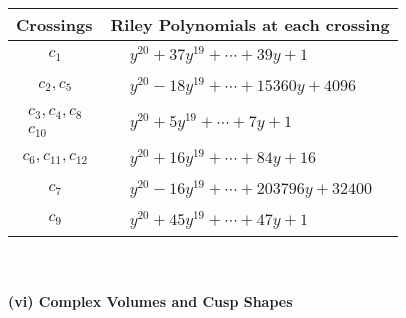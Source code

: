 \documentclass[1p]{elsarticle_modified}
\theoremstyle{definition}
\begin{document}
\begin{tabular}{m{50pt}|m{274pt}}
Crossings & \hspace{64pt}Riley Polynomials at each crossing \\
\hline $$\begin{aligned}c_{1}\end{aligned}$$&$\begin{aligned}
&y^{20}+37 y^{19}+\cdots+39 y+1
\end{aligned}$\\
\hline $$\begin{aligned}c_{2},c_{5}\end{aligned}$$&$\begin{aligned}
&y^{20}-18 y^{19}+\cdots+15360 y+4096
\end{aligned}$\\
\hline $$\begin{aligned}c_{3},c_{4},c_{8}\\c_{10}\end{aligned}$$&$\begin{aligned}
&y^{20}+5 y^{19}+\cdots+7 y+1
\end{aligned}$\\
\hline $$\begin{aligned}c_{6},c_{11},c_{12}\end{aligned}$$&$\begin{aligned}
&y^{20}+16 y^{19}+\cdots+84 y+16
\end{aligned}$\\
\hline $$\begin{aligned}c_{7}\end{aligned}$$&$\begin{aligned}
&y^{20}-16 y^{19}+\cdots+203796 y+32400
\end{aligned}$\\
\hline $$\begin{aligned}c_{9}\end{aligned}$$&$\begin{aligned}
&y^{20}+45 y^{19}+\cdots+47 y+1
\end{aligned}$\\
\hline
\end{tabular}\\~\\
\newpage\flushleft \textbf{(vi) Complex Volumes and Cusp Shapes}
\end{document}

